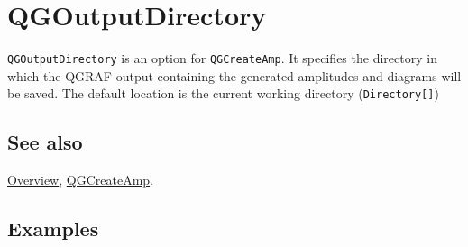 \documentclass[../FeynHelpersManual.tex]{subfiles}
\begin{document}
\hypertarget{qgoutputdirectory}{
\section{QGOutputDirectory}\label{qgoutputdirectory}}

\texttt{QGOutputDirectory} is an option for \texttt{QGCreateAmp}. It
specifies the directory in which the QGRAF output containing the
generated amplitudes and diagrams will be saved. The default location is
the current working directory (\texttt{Directory[\allowbreak{}]})

\subsection{See also}

\hyperlink{toc}{Overview}, \hyperlink{qgcreateamp}{QGCreateAmp}.

\subsection{Examples}
\end{document}
